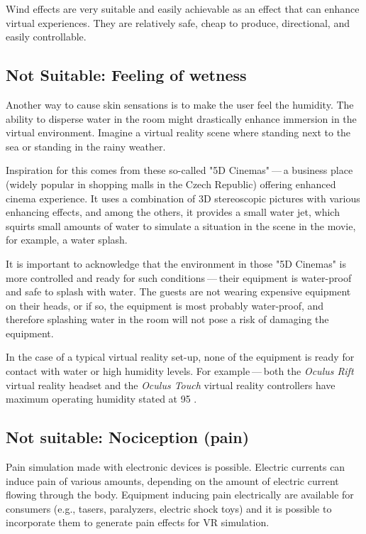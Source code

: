 Wind effects are very suitable and easily achievable as an effect that can
enhance virtual experiences. They are relatively safe, cheap to produce,
directional, and easily controllable.


\hypertarget{x-not-suitable:-feeling-of-wetness}{\subsection{Not Suitable: Feeling of wetness}}
Another way to cause skin sensations is to make the user feel the humidity.
The ability to disperse water in the room might drastically enhance immersion
in the virtual environment. Imagine a virtual reality scene where standing
next to the sea or standing in the rainy weather.


Inspiration for this comes from these so-called "5D Cinemas" — a business
place (widely popular in shopping malls in the Czech Republic) offering
enhanced cinema experience. It uses a combination of 3D stereoscopic
pictures with various enhancing effects, and among the others, it provides
a small water jet, which squirts small amounts of water to simulate a
situation in the scene in the movie, for example, a water splash. \hyperlink{5dcin}{}


It is important to acknowledge that the environment in those "5D Cinemas"
is more controlled and ready for such conditions — their equipment
is water-proof and safe to splash with water. The guests are not
wearing expensive equipment on their heads, or if so, the equipment is
most probably water-proof, and therefore splashing water in the room will not
pose a risk of damaging the equipment.


In the case of a typical virtual reality set-up, none of the equipment is ready
for contact with water or high humidity levels. For example — both the
\emph{Oculus Rift} virtual reality headset and the \emph{Oculus Touch} virtual reality
controllers have maximum operating humidity stated at 95%
\hyperlink{orhswg}{}.


\hypertarget{x-not-suitable:-nociception-(pain)}{\subsection{Not suitable: Nociception (pain)}}
Pain simulation made with electronic devices is possible. Electric currents can
induce pain of various amounts, depending on the amount of electric current
flowing through the body. \hyperlink{elepain}{}
Equipment inducing pain electrically are available for consumers
(e.g., tasers, paralyzers, electric shock toys) and it is possible to
incorporate them to generate pain effects for VR simulation.


